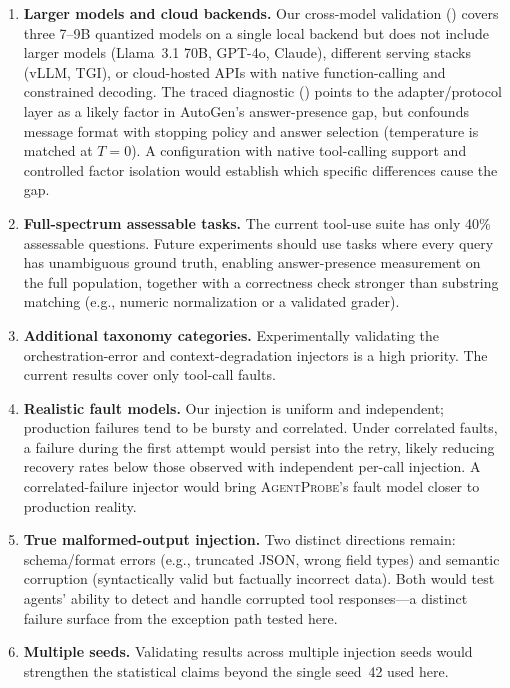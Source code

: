 \documentclass[make,article,submit,moreauthors,pdftex]{mdpi}
\providecommand{\agentprobe}{\textsc{AgentProbe}}
\newcommand{\Wrev}[1]{\texorpdfstring{{\color{RevisionOrange}#1}}{#1}}
\begin{document}
\begin{enumerate}
  \item {\textbf{Larger models and cloud backends.} Our cross-model validation () covers three 7--9B quantized models on a single local backend but does not include larger models (Llama~3.1 70B, GPT-4o, Claude), different serving stacks (vLLM, TGI), or cloud-hosted APIs with native function-calling and constrained decoding. The traced diagnostic () points to the adapter/protocol layer as a likely factor in AutoGen's answer-presence gap, but confounds message format with stopping policy and answer selection (temperature is matched at $T\!=\!0$). A configuration with native tool-calling support and controlled factor isolation would establish which specific differences cause the gap.}

  \item {\textbf{Full-spectrum assessable tasks.} The current tool-use suite has only 40\% assessable questions. Future experiments should use tasks where every query has unambiguous ground truth, enabling answer-presence measurement on the full population\Wrev{, together with a correctness check stronger than substring matching (e.g., numeric normalization or a validated grader)}.}

  \item {\textbf{Additional taxonomy categories.} Experimentally validating the orchestration-error and context-degradation injectors is a high priority. The current results cover only tool-call faults.}

  \item {\textbf{Realistic fault models.} Our injection is uniform and independent; production failures tend to be bursty and correlated. Under correlated faults, a failure during the first attempt would persist into the retry, likely reducing recovery rates below those observed with independent per-call injection. A correlated-failure injector would bring \agentprobe{}'s fault model closer to production reality.}

  \item {\textbf{True malformed-output injection.} Two distinct directions remain: schema/format errors (e.g., truncated JSON, wrong field types) and semantic corruption (syntactically valid but factually incorrect data). Both would test agents' ability to detect and handle corrupted tool responses---a distinct failure surface from the exception path tested here.}

  \item {\textbf{Multiple seeds.} Validating results across multiple injection seeds would strengthen the statistical claims beyond the single seed~42 used here.}
\end{enumerate}
\end{document}
